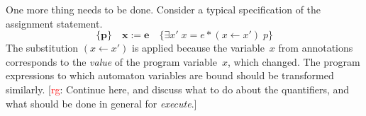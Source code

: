 \documentclass[a4paper]{article}
\newcommand{\rg}[1]{\todo{rg}{#1}}
\newcommand{\todo}[2]{{\small [\textcolor{red}{#1}: #2]}}
\theoremstyle{slanted}
\theoremstyle{definition}
\theoremstyle{remark}
\begin{document}
One more thing needs to be done.
Consider a typical specification of the assignment statement.
  \[ \{\mathbf p\}\quad
  \mathbf x:=\mathbf e
  \quad\{\exists x'\;x=e * (x\gets x')\;p\}\]
The substitution $(x\gets x')$ is applied because the variable~$x$ from annotations corresponds to the \emph{value} of the program variable~$x$, which changed.
The program expressions to which automaton variables are bound should be transformed similarly.
\rg{Continue here, and discuss what to do about the quantifiers, and what should be done in general for \textit{execute}.}





\end{document}
